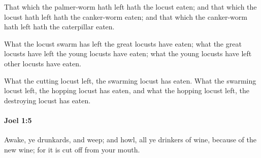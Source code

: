 			\begin{versebox}
					\item[BHS] 
					\item[LXX] 
					\item[ASV] That which the palmer-worm hath left hath the locust eaten; and that which the locust hath left hath the canker-worm eaten; and that which the canker-worm hath left hath the caterpillar eaten.
					\item[NIV] What the locust swarm has left the great locusts have eaten; what the great locusts have left the young locusts have eaten; what the young locusts have left other locusts have eaten.
					\item[NRSV] What the cutting locust left, the swarming locust has eaten. What the swarming locust left, the hopping locust has eaten, and what the hopping locust left, the destroying locust has eaten.
			\end{versebox}

		\paragraph{Joel 1:5} %
			\label{JOEL-1-5}

			Awake, ye drunkards, and weep; and howl, all ye drinkers of wine, because of the new wine; for it is cut off from your mouth.

